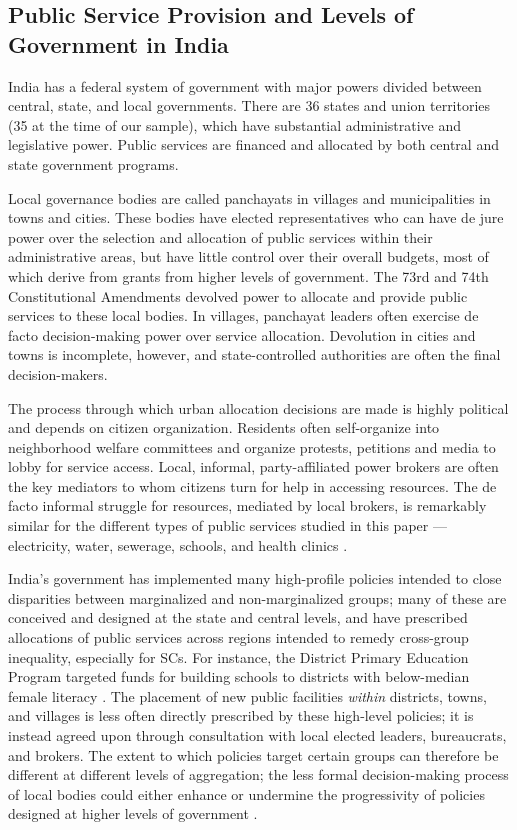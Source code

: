 \documentclass[12pt]{article}
\begin{document}
\subsection{Public Service Provision and Levels of Government in India}

India has a federal system of government with major powers divided between central, state, and local governments. There are 36 states and union territories (35 at the time of our sample), which have substantial administrative and legislative power. Public services are financed and allocated by both central and state government programs.

Local governance bodies are called panchayats in villages and municipalities in towns and cities. These bodies have elected representatives who can have de jure power over the selection and allocation of public services within their administrative areas, but have little control over their overall budgets, most of which derive from grants from higher levels of government. The 73rd and 74th Constitutional Amendments devolved power to allocate and provide public services to these local bodies. In villages, panchayat leaders often exercise de facto decision-making power over service allocation. Devolution in cities and towns is incomplete, however, and state-controlled authorities are often the final decision-makers.

The process through which urban allocation decisions are made is highly political and depends on citizen organization. Residents often self-organize into neighborhood welfare committees and organize protests, petitions and media to lobby for service access. Local, informal, party-affiliated power brokers are often the key mediators to whom citizens turn for help in accessing resources. The de facto informal struggle for resources, mediated by local brokers, is remarkably similar for the different types of public services studied in this paper --- electricity, water, sewerage, schools, and health clinics \citep{jensenius2017,krukswisner2018,auerbach2019,auerbach2020}.

India's government has implemented many high-profile policies intended to close disparities between marginalized and non-marginalized groups; many of these are conceived and designed at the state and central levels, and have prescribed allocations of public services across regions intended to remedy cross-group inequality, especially for SCs. For instance, the District Primary Education Program targeted funds for building schools to districts with below-median female literacy \citep{khanna2017}. The placement of new public facilities \textit{within} districts, towns, and villages is less often directly prescribed by these high-level policies; it is instead agreed upon through consultation with local elected leaders, bureaucrats, and brokers. The extent to which policies target certain groups can therefore be different at different levels of aggregation; the less formal decision-making process of local bodies could either enhance or undermine the progressivity of policies designed at higher levels of government \citep{alatas2012}.
\end{document}
